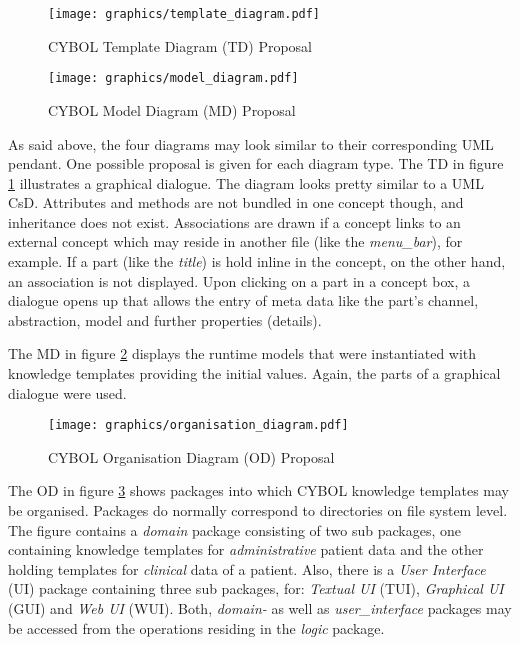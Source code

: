 \begin{figure}[ht]
    \begin{center}
        \texttt{[image: graphics/template\_diagram.pdf]}
        \caption{CYBOL Template Diagram (TD) Proposal}
        \label{template_diagram_figure}
    \end{center}
\end{figure}

\begin{figure}[ht]
    \begin{center}
        \texttt{[image: graphics/model\_diagram.pdf]}
        \caption{CYBOL Model Diagram (MD) Proposal}
        \label{model_diagram_figure}
    \end{center}
\end{figure}

\clearpage

As said above, the four diagrams may look similar to their corresponding UML
pendant. One possible proposal is given for each diagram type. The TD in figure
\ref{template_diagram_figure} illustrates a graphical dialogue. The diagram
looks pretty similar to a UML CsD. Attributes and methods are not bundled in
one concept though, and inheritance does not exist. Associations are drawn if a
concept links to an external concept which may reside in another file (like the
\emph{menu\_bar}), for example. If a part (like the \emph{title}) is hold
inline in the concept, on the other hand, an association is not displayed. Upon
clicking on a part in a concept box, a dialogue opens up that allows the entry
of meta data like the part's channel, abstraction, model and further properties
(details).

The MD in figure \ref{model_diagram_figure} displays the runtime models that were
instantiated with knowledge templates providing the initial values. Again, the
parts of a graphical dialogue were used.

\begin{figure}[ht]
    \begin{center}
        \texttt{[image: graphics/organisation\_diagram.pdf]}
        \caption{CYBOL Organisation Diagram (OD) Proposal}
        \label{organisation_diagram_figure}
    \end{center}
\end{figure}

The OD in figure \ref{organisation_diagram_figure} shows packages into which CYBOL knowledge
templates may be organised. Packages do normally correspond to directories on
file system level. The figure contains a \emph{domain} package consisting of
two sub packages, one containing knowledge templates for \emph{administrative}
patient data and the other holding templates for \emph{clinical} data of a
patient. Also, there is a \emph{User Interface} (UI) package containing three
sub packages, for: \emph{Textual UI} (TUI), \emph{Graphical UI} (GUI) and
\emph{Web UI} (WUI). Both, \emph{domain-} as well as \emph{user\_interface}
packages may be accessed from the operations residing in the \emph{logic}
package.

